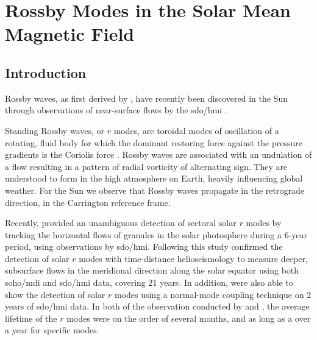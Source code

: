 \chapter{Rossby Modes in the Solar Mean Magnetic Field}\label{chap:rmode}

\section{Introduction}\label{sec:rmode_intro}


Rossby waves, as first derived by \citet{rossby_relation_1939}, have recently been discovered in the Sun through observations of near-surface flows by the \gls{sdo/hmi} \citep{loptien_global-scale_2018, liang_time-distance_2019}.

Standing Rossby waves, or $r$ modes, are toroidal modes of oscillation of a rotating, fluid body for which the dominant restoring force against the pressure gradients is the Coriolis force \citep{lanza_sectoral_2019, hathaway_hydrodynamic_2020}. Rossby waves are associated with an undulation of a flow resulting in a pattern of radial vorticity of alternating sign. They are understood to form in the high atmosphere on Earth, heavily influencing global weather. For the Sun we observe that Rossby waves propagate in the retrograde direction, in the Carrington reference frame.

Recently, \citet{loptien_global-scale_2018} provided an unambiguous detection of sectoral solar $r$ modes by tracking the horizontal flows of granules in the solar photosphere during a 6-year period, using observations by \gls{sdo/hmi}. Following this study \citet{liang_time-distance_2019} confirmed the detection of solar $r$ modes with time-distance helioseismology to measure deeper, subsurface flows in the meridional direction along the solar equator using both \gls{soho/mdi} and \gls{sdo/hmi} data, covering 21 years. In addition, \citet{hanasoge_detection_2019} were also able to show the detection of solar $r$ modes using a normal-mode coupling technique on 2 years of \gls{sdo/hmi} data. In both of the observation conducted by \citet{loptien_global-scale_2018} and \citet{liang_time-distance_2019}, the average lifetime of the $r$ modes were on the order of several months, and as long as a over a year for specific modes.

